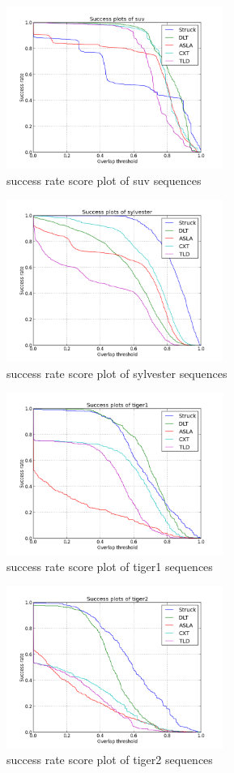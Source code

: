 \documentclass{acm_proc_article-sp}
\begin{document}
\begin{figure}[hbt]
    \includegraphics[width=200pt]{suv}
    \caption{success rate score plot of suv sequences}
    \label{fig:suv}
\end{figure}

\begin{figure}[hbt]
    \includegraphics[width=200pt]{sylvester}
    \caption{success rate score plot of sylvester sequences}
    \label{fig:sylvester}
\end{figure}

\begin{figure}[hbt]
    \includegraphics[width=200pt]{tiger1}
    \caption{success rate score plot of tiger1 sequences}
    \label{fig:tiger1}
\end{figure}

\begin{figure}[hbt]
    \includegraphics[width=200pt]{tiger2}
    \caption{success rate score plot of tiger2 sequences}
    \label{fig:tiger2}
\end{figure}
\end{document}
